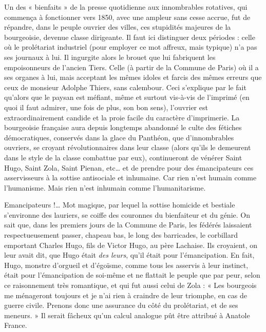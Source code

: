 \documentclass[french,twoside]{book} %
\begin{document}
Un des « bienfaits » de la presse quotidienne aux innombrables rotatives, qui commença à fonctionner vers 1850, avec une ampleur sans cesse accrue, fut de répandre, dans le peuple ouvrier des villes, ces stupidités majeures de la bourgeoisie, devenue classe dirigeante. Il faut ici distinguer deux périodes : celle où le prolétariat industriel (pour employer ce mot affreux, mais typique) n’a pas ses journaux à lui. Il ingurgite alors le brouet que lui fabriquent les empoisonneurs de l’ancien Tiers. Celle (à partir de la Commune de Paris) où il a ses organes à lui, mais acceptant les mêmes idoles et farcis des mêmes erreurs que ceux de monsieur Adolphe Thiers, sans calembour. Ceci s’explique par le fait qu’alors que le paysan est méfiant, même et surtout vis-à-vis de l’imprimé (en quoi il faut admirer, une fois de plus, son bon sens), l’ouvrier est extraordinairement candide et la proie facile du caractère d’imprimerie. La bourgeoisie française aura depuis longtemps abandonné le culte des fétiches démocratiques, conservés dans la glace du Panthéon, que d’innombrables ouvriers, se croyant révolutionnaires dans leur classe (alors qu’ils le demeurent dans le style de la classe combattue par eux), continueront de vénérer Saint Hugo, Saint Zola, Saint Pienan, etc… et de prendre pour des émancipateurs ces asservisseurs à la sottise antisociale et inhumaine. Car rien n’est humain comme l’humanisme. Mais rien n’est inhumain comme l’humanitarisme.\par
Emancipateurs !… Mot magique, par lequel la sottise homicide et bestiale s’environne des lauriers, se coiffe des couronnes du bienfaiteur et du génie. On sait que, dans les premiers jours de la Commune de Paris, les fédérés laissaient respectueusement passer, chapeau bas, le long des barricades, le corbillard emportant Charles Hugo, fils de Victor Hugo, au père Lachaise. Ils croyaient, on leur avait dit, que Hugo était {\itshape des leurs}, qu’il était pour l’émancipation. En fait, Hugo, monstre d’orgueil et d’égoïsme, comme tous les asservis à leur instinct, était pour l’émancipation de soi-même et ne flattait le peuple que par peur, selon ce raisonnement très romantique, et qui fut aussi celui de Zola : « Les bourgeois me ménageront toujours et je n’ai rien à craindre de leur triomphe, en cas de guerre civile. Prenons donc une assurance du côté du prolétariat, et de ses meneurs. » Il serait fâcheux qu’un calcul analogue pût être attribué à Anatole France.\par
\end{document}
